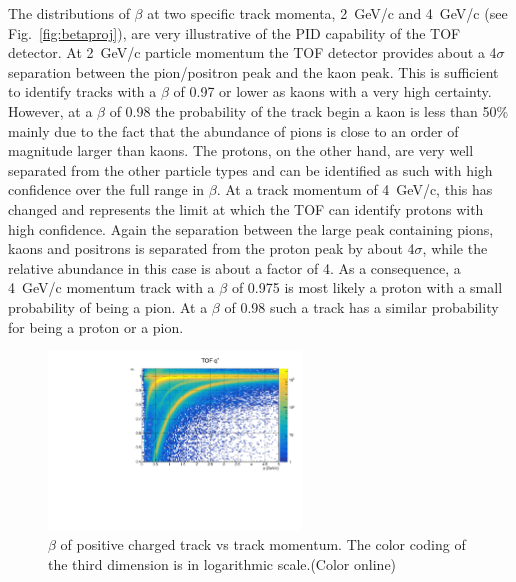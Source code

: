 The distributions of $\beta$ at two specific track momenta, 2~GeV/c and 4~GeV/c (see Fig.~\ref{fig:betaproj}), are very illustrative of the PID capability of the TOF detector. At 2~GeV/c particle momentum the TOF detector provides about a 4$\sigma$ separation between
the pion/positron peak and the kaon peak. This is sufficient to identify tracks with a $\beta$ of 0.97 or lower as kaons with a very
high certainty. However, at a $\beta$ of 0.98 the probability of the track begin a kaon is less than 50\% mainly due to the fact
that the abundance of pions is close to an order of magnitude larger than kaons. The protons, on the other hand, are very well
separated from the other particle types and can be identified as such with high confidence over the full range in $\beta$.
At a track momentum of 4~GeV/c, this has changed and represents the limit at which the TOF can identify protons with high confidence. Again the separation between the large peak containing pions, kaons and positrons is separated from the proton
peak by about 4$\sigma$, while the relative abundance in this case is about a factor of 4. As a consequence, a 4~GeV/c momentum
track with a $\beta$ of 0.975 is most likely a proton with a small probability of being a pion. At a $\beta$ of 0.98 such
a track has a similar probability for being a proton or a pion.
\begin{figure}[tbp]
\begin{center}
\includegraphics[width=0.6\textwidth]{figures/beta_vs_p_positivetracks.pdf}
\caption{\label{fig:betavsp}$\beta$ of positive charged track vs track momentum. The color coding of the third dimension
is in logarithmic scale.(Color online)}
\end{center}
\end{figure}

